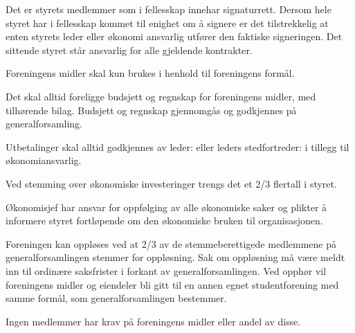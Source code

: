 \documentclass{rapport}
\begin{document}

Det er styrets medlemmer som i fellesskap innehar signaturrett. Dersom hele styret har i
fellesskap kommet til enighet om å signere er det tilstrekkelig at enten styrets leder eller
økonomi ansvarlig utfører den faktiske signeringen. Det sittende styret står ansvarlig for alle
gjeldende kontrakter.


Foreningens midler skal kun brukes i henhold til foreningens formål.

Det skal alltid foreligge budsjett og regnskap for foreningens midler, med tilhørende bilag.
Budsjett og regnskap gjennomgås og godkjennes på generalforsamling.

Utbetalinger skal alltid godkjennes av leder: eller leders stedfortreder: i tillegg til
økonomiansvarlig.

Ved stemming over økonomiske investeringer trengs det et 2/3 flertall i styret.

Økonomisjef har ansvar for oppfølging av alle økonomiske saker og plikter å
informere styret fortløpende om den økonomiske bruken til organisasjonen.


Foreningen kan oppløses ved at 2/3 av de stemmeberettigede medlemmene på
generalforsamlingen stemmer for oppløsning. Sak om oppløsning må være meldt inn til
ordinære saksfrister i forkant av generalforsamlingen. Ved opphør vil foreningens midler og
eiendeler bli gitt til en annen egnet studentforening med samme formål, som
generalforsamlingen bestemmer.

Ingen medlemmer har krav på foreningens midler eller andel av disse.
\end{document}
